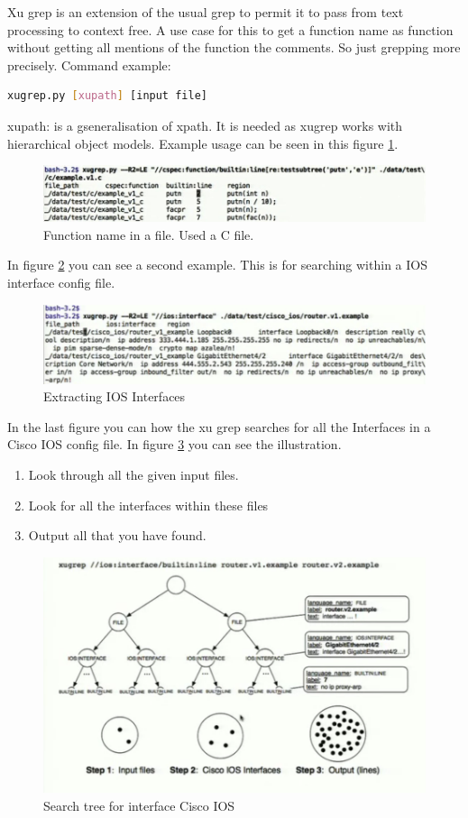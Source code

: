 Xu grep is an extension of the usual grep to permit it to pass from text processing to context free. A use case for this to get a function name as function without getting all mentions of the function the comments. So just grepping more precisely.
Command example:
\begin{lstlisting}[language=bash]
   xugrep.py [xupath] [input file]
\end{lstlisting}

xupath: is a gseneralisation of xpath. It is needed as xugrep works with hierarchical object models.
Example usage can be seen in this figure \ref{fig:example1xugrep}.

\begin{figure}
\caption{Function name in a file. Used a C file.}
\label{fig:example1xugrep}
\includegraphics[width=\textwidth]{images/example1xugrep.jpg}
\end{figure}

In figure \ref{fig:example2xugrep} you can see a second example. This is for searching within a IOS interface config file.

\begin{figure}
\caption{Extracting IOS Interfaces}
\label{fig:example2xugrep}
\includegraphics[width=\textwidth]{images/example2xugrep.png}
\end{figure}

In the last figure you can how the xu grep searches for all the Interfaces in a Cisco IOS config file. In figure \ref{fig:example3xugrep} you can see the illustration.
\begin{enumerate}
\item Look through all the given input files.
\item Look for all the interfaces within these files
\item Output all that you have found. 
\end{enumerate}

\begin{figure}
\caption{Search tree for interface Cisco IOS}
\label{fig:example3xugrep}
\includegraphics[width=\textwidth]{images/example3xugrep.png}
\end{figure}
